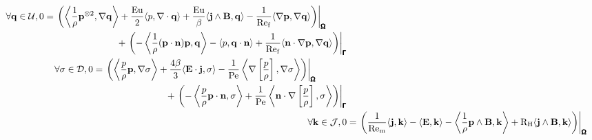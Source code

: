     \begin{align}
        \begin{split}
            \forall \mathbf{q} \in \mathcal{U},  0  &=  \left.\left(\left\langle\frac{1}{\rho}\mathbf{p}^{\otimes 2}, \nabla\mathbf{q}\right\rangle + \frac{\mathrm{Eu}}{2}\langle p, \nabla\cdot\mathbf{q}\rangle + \frac{\mathrm{Eu}}{\beta}\langle\mathbf{j}\wedge\mathbf{B}, \mathbf{q}\rangle - \frac{1}{\mathrm{Re}_{\mathrm{f}}}\langle\nabla\mathbf{p}, \nabla\mathbf{q}\rangle\right)\right|_{\pmb{\mathsf{\Omega}}}  \\
            &\;\;\;\;\;\;\;\;\;\;\;\;\;\;\;\;\;\;\;\;\;\;\;\;\;\;\;\;  + \left.\left(- \left\langle\frac{1}{\rho}(\mathbf{p}\cdot\mathbf{n})\mathbf{p}, \mathbf{q}\right\rangle - \langle p, \mathbf{q}\cdot\mathbf{n}\rangle + \frac{1}{\mathrm{Re}_{\mathrm{f}}}\langle\mathbf{n}\cdot\nabla\mathbf{p}, \nabla\mathbf{q}\rangle\right)\right|_{\pmb{\mathsf{\Gamma}}}
        \end{split}  \\
        \begin{split}
            \forall \sigma \in \mathcal{D},  0  &=  \left.\left(\left\langle\frac{p}{\rho}\mathbf{p}, \nabla\sigma\right\rangle + \frac{4\beta}{3}\langle\mathbf{E}\cdot\mathbf{j}, \sigma\rangle - \frac{1}{\mathrm{Pe}}\left\langle\nabla\left[\frac{p}{\rho}\right], \nabla\sigma\right\rangle\right)\right|_{\pmb{\mathsf{\Omega}}}  \\
            &\;\;\;\;\;\;\;\;\;\;\;\;\;\;\;\;\;\;\;\;\;\;\;\;\;\;\;\;  + \left.\left(- \left\langle\frac{p}{\rho}\mathbf{p}\cdot\mathbf{n}, \sigma\right\rangle + \frac{1}{\mathrm{Pe}}\left\langle\mathbf{n}\cdot\nabla\left[\frac{p}{\rho}\right], \sigma\right\rangle\right)\right|_{\pmb{\mathsf{\Gamma}}}
        \end{split}  \\
        \forall \mathbf{k} \in \mathcal{J},  0  &=  \left.\left(\frac{1}{\mathrm{Re}_{\mathrm{m}}}\langle\mathbf{j}, \mathbf{k}\rangle - \langle\mathbf{E}, \mathbf{k}\rangle - \left\langle\frac{1}{\rho}\mathbf{p}\wedge\mathbf{B}, \mathbf{k}\right\rangle + \mathrm{R}_{\mathrm{H}}\langle\mathbf{j}\wedge\mathbf{B}, \mathbf{k}\rangle\right)\right|_{\pmb{\mathsf{\Omega}}}  \\
    \end{align}
    